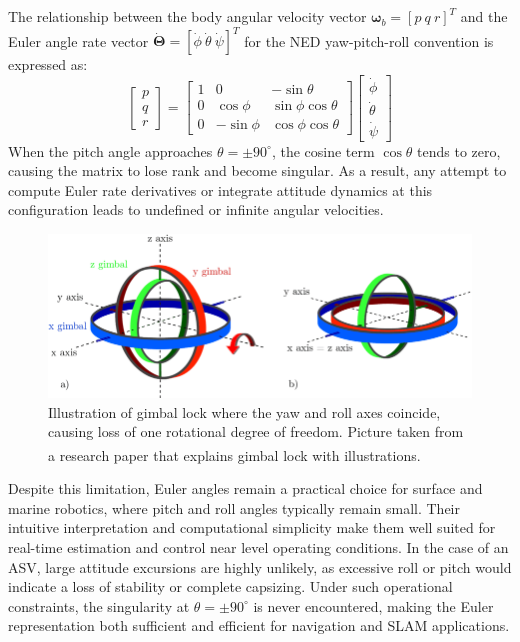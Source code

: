 \\ \\
The relationship between the body angular velocity vector $\boldsymbol{\omega}_b = [p~q~r]^T$ and the Euler angle rate vector $\dot{\boldsymbol{\Theta}} = [\dot{\phi}~\dot{\theta}~\dot{\psi}]^T$ for the NED yaw-pitch-roll convention is expressed as:
$$
    \begin{bmatrix}
        p \\ q \\ r
    \end{bmatrix}
    =
    \begin{bmatrix}
        1 & 0 & -\sin\theta \\
        0 & \cos\phi & \sin\phi\cos\theta \\
        0 & -\sin\phi & \cos\phi\cos\theta
    \end{bmatrix}
    \begin{bmatrix}
        \dot{\phi} \\ \dot{\theta} \\ \dot{\psi}
    \end{bmatrix}
$$
When the pitch angle approaches $\theta = \pm90^{\circ}$, the cosine term $\cos\theta$ tends to zero, causing the matrix to lose rank and become singular. As a result, any attempt to compute Euler rate derivatives or integrate attitude dynamics at this configuration leads to undefined or infinite angular velocities.
\begin{figure}[H]
    \centering
    \includegraphics[width=0.9\linewidth]{Pictures/System_Modeling/Orientation_Representations/Gimbal_Lock.png}
    \caption{Illustration of gimbal lock where the yaw and roll axes coincide, causing loss of one rotational degree of freedom. Picture taken from a research paper that explains gimbal lock with illustrations.\textsuperscript{\cite{gimbal_lock}}}
    \label{fig:system-modeling-gimbal-lock}
\end{figure}
\noindent
Despite this limitation, Euler angles remain a practical choice for surface and marine robotics, where pitch and roll angles typically remain small. Their intuitive interpretation and computational simplicity make them well suited for real-time estimation and control near level operating conditions. In the case of an ASV, large attitude excursions are highly unlikely, as excessive roll or pitch would indicate a loss of stability or complete capsizing. Under such operational constraints, the singularity at $\theta = \pm90^{\circ}$ is never encountered, making the Euler representation both sufficient and efficient for navigation and SLAM applications.



